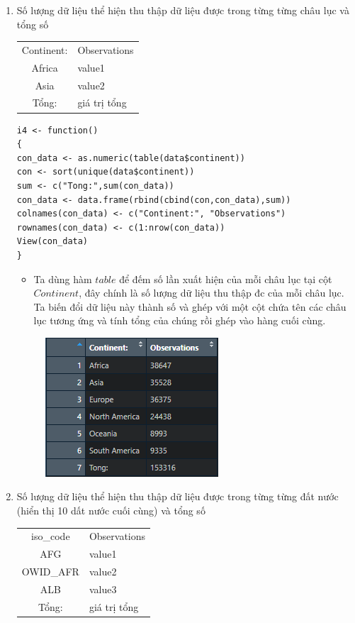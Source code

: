 \documentclass[a4paper]{article}
\theoremstyle{definition}
\begin{document}
\begin{enumerate}[i)]
\begin{enumerate}[1)]
	
		\item Số lượng dữ liệu thể hiện thu thập dữ liệu được trong từng từng châu lục và tổng số
		\begin{center}
			\begin{tabular}{ c l }
				Continent: & Observations \\ 
				Africa & value1  \\ 
				Asia & value2 \\
				Tổng: & giá trị tổng
			\end{tabular}
		\end{center}
		\begin{lstlisting}[frame=single]  
i4 <- function()
{
con_data <- as.numeric(table(data$continent))
con <- sort(unique(data$continent))
sum <- c("Tong:",sum(con_data))
con_data <- data.frame(rbind(cbind(con,con_data),sum))
colnames(con_data) <- c("Continent:", "Observations")
rownames(con_data) <- c(1:nrow(con_data))
View(con_data)
}
	\end{lstlisting}
\begin{itemize}
    \item Ta dùng hàm $table$ để đếm số lần xuất hiện của mỗi châu lục tại cột $Continent$, đây chính là số lượng dữ liệu thu thập đc của mỗi châu lục. Ta biến đổi dữ liệu này thành số và ghép với một cột chứa tên các châu lục tương ứng và tính tổng của chúng rồi ghép vào hàng cuối cùng.
\end{itemize}
	\begin{figure}[h!]
		\begin{center}
		    \includegraphics[scale=1.1]{Images/I/I4.png}
		\end{center}
	\end{figure}
		
		\item Số lượng dữ liệu thể hiện thu thập dữ liệu được trong từng từng đất nước (hiển thị 10 dất nước cuối cùng) và tổng số
		\begin{center}
			\begin{tabular}{ c l }
				iso\_code & Observations \\ 
				AFG & value1  \\ 
				OWID\_AFR & value2 \\
				ALB & value3\\
				Tổng: & giá trị tổng
			\end{tabular}
		\end{center}
		

\end{enumerate}
\end{enumerate}
\end{document}
